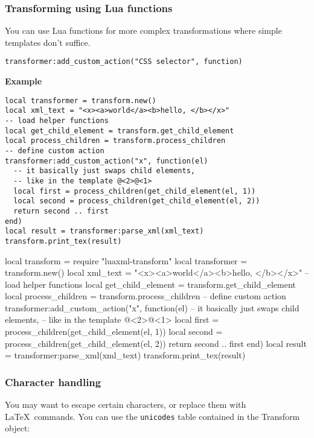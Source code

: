 \documentclass{ltxdoc}
\begin{document}
\subsubsection{Transforming using Lua functions}

You can use Lua functions for more complex transformations where simple templates don't suffice. 

\begin{verbatim}
transformer:add_custom_action("CSS selector", function)
\end{verbatim}


\noindent\textbf{Example}
\begin{verbatim}
local transformer = transform.new()
local xml_text = "<x><a>world</a><b>hello, </b></x>"
-- load helper functions
local get_child_element = transform.get_child_element
local process_children = transform.process_children
-- define custom action
transformer:add_custom_action("x", function(el)
  -- it basically just swaps child elements, 
  -- like in the template @<2>@<1>
  local first = process_children(get_child_element(el, 1))
  local second = process_children(get_child_element(el, 2))
  return second .. first
end)
local result = transformer:parse_xml(xml_text)
transform.print_tex(result)
\end{verbatim}

\begin{framed}
\begin{luacode*}

local transform = require "luaxml-transform"
local transformer = transform.new()
local xml_text = "<x><a>world</a><b>hello, </b></x>"
-- load helper functions
local get_child_element = transform.get_child_element
local process_children = transform.process_children
-- define custom action
transformer:add_custom_action("x", function(el)
  -- it basically just swaps child elements, 
  -- like in the template @<2>@<1>
  local first = process_children(get_child_element(el, 1))
  local second = process_children(get_child_element(el, 2))
  return second .. first
end)
local result = transformer:parse_xml(xml_text)
transform.print_tex(result)
\end{luacode*}
\end{framed}

\subsubsection{Character handling}

You may want to escape certain characters, or replace them with
\LaTeX\ commands. You can use the \texttt{unicodes} table contained 
in the Transform object:
\end{document}
